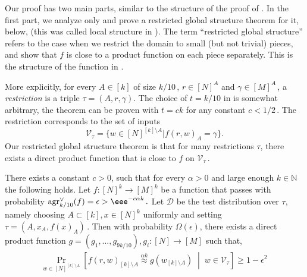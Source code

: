 \documentclass{toc}
\newcommand{\Prob}[2][]{\Pr_{{#1}}\left[#2\right]} %
\newcommand{\brac}[1]{[#1]} %
\newcommand{\given}{\;\middle\vert\;} %
\newcommand\f{f} %
\newcommand{\g}{g} %
\newcommand\pf{g} %
\newcommand{\test}[2]{
	\ifx &#2&
	\textrm{agr}^{#1}
	\else	
	\textrm{agr}^{#1}_{#2}
	\fi}
\newcommand\neql[1]{\stackrel{{#1}}{ \approx}} %
\newcommand\cons{\mathcal{V}} %
\begin{document}
Our proof has two main parts, similar to the structure of the proof of \cite{dinur2008locally,impagliazzo2012new}. In the first part, we analyze only  and prove a restricted global structure theorem for it,  below, (this was called local structure in \cite{impagliazzo2012new,dinur2014direct}). The term ``restricted global structure'' refers to
the case %
when we restrict the domain to small (but not trivial) pieces, and show that $f$ is close to a product function on each piece separately. This is the structure of the function in .


More explicitly, for every $A\in[k]$ of size $k/10$\,, $r\in[N]^A$ and $\gamma\in[M]^A$\,, a \emph{restriction} is a triple $\tau = (A,r,\gamma)$. The choice of $t=k/10$ in  is somewhat arbitrary, the theorem can be proven with $t=ck$ for
any constant  %
%
%
$c < 1/2$\,.   %
The restriction corresponds to the set of inputs
%
\[\mathcal{V}_\tau = \{w\in [N]^{[k]\setminus A} | \f(r,w)_A = \gamma \}.\]
Our restricted global structure theorem is that for many restrictions $\tau$, 
there %
exists  %
a direct product function that is close to $\f$ on $\cons_{\tau}$\,.

\begin{theorem} \label{thm:informal local}
	There exists a %
constant $c>0$, such that for every %
$\alpha>0$ and large enough $k\in\mathbb{N}$ the following holds.
Let $\f:[N]^k\rightarrow[M]^k$ be a function that passes  with probability  $\test{\vee}{k/10}(f)=\epsilon > \eee^{-c\alpha k}\,.$
%
%
%
Let $\mathcal{D}$ be the test distribution over $\tau$, namely choosing $A\subset[k],x\in[N]^k$ uniformly and setting $\tau=(A,x_A,\f(x)_A)$\,. Then %
%
with probability $\Omega(\epsilon)$, there exists a direct product function $\pf = (\g_1,\ldots, \g_{9k/10}), \g_i:[N]\rightarrow [M]$ such that,
	\begin{align} \label{eq:local}
	\Prob[w\in\brac{N}^{\brac{k}\setminus A}]{\f(r,w)_{[k]\setminus A} \neql{\alpha k} \pf(w_{[k]\setminus A}) \given w\in\mathcal{V}_\tau} \geq 1-\epsilon^{2 }\, %
	\end{align}
%
%
%
%
%
\end{theorem}
\end{document}
